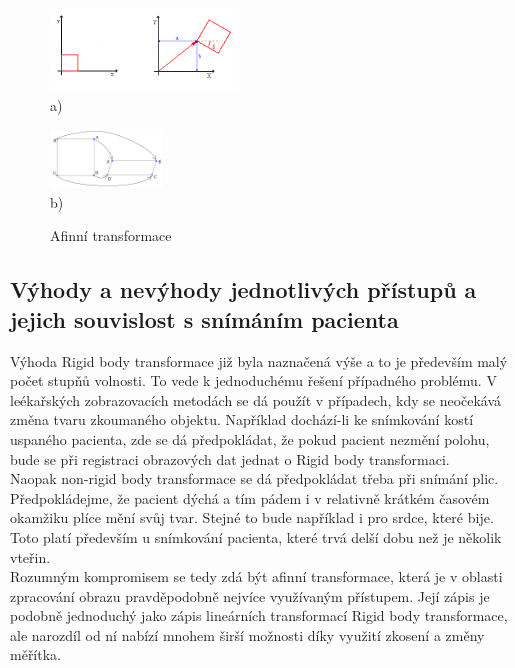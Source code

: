\documentclass{thesis}%
\begin{document}
 \begin{figure}[htp!]
  \centering
   \begin{minipage}[c]{0.3\textwidth}
     \centering\includegraphics[width=5cm]{afinni.png} \\
     a)
   \end{minipage}
   \hspace*{1cm}
    \begin{minipage}[c]{0.3\textwidth}
     \centering\includegraphics[width=3cm]{afinni2.png} \\
     b)
   \end{minipage}

      \caption[Afinní transformace]{Afinní transformace}
\end{figure}

\subsection{Výhody a nevýhody jednotlivých přístupů a jejich souvislost s snímáním pacienta}
Výhoda Rigid body transformace již byla naznačená výše a to je především malý počet stupňů volnosti. To vede k jednoduchému řešení případného problému. V leékařských zobrazovacích metodách se  dá použít v případech, kdy se neočekává změna tvaru zkoumaného objektu. Například dochází-li ke snímkování kostí uspaného pacienta, zde se dá předpokládat, že pokud pacient nezmění polohu, bude se při registraci obrazových dat jednat o Rigid body transformaci. \\
Naopak non-rigid body transformace se dá předpokládat třeba při snímání plic. Předpokládejme, že pacient dýchá a tím pádem i v relativně krátkém časovém okamžiku plíce mění svůj tvar. Stejné to bude například i pro srdce, které bije. Toto platí především u  snímkování pacienta, které trvá delší dobu než je několik vteřin.\\
Rozumným kompromisem se tedy zdá být afinní transformace, která je v oblasti zpracování obrazu pravděpodobně nejvíce využívaným přístupem. Její zápis je podobně jednoduchý jako zápis lineárních transformací Rigid body transformace, ale narozdíl od ní nabízí mnohem širší možnosti díky využití zkosení a změny měřítka.
\end{document}
